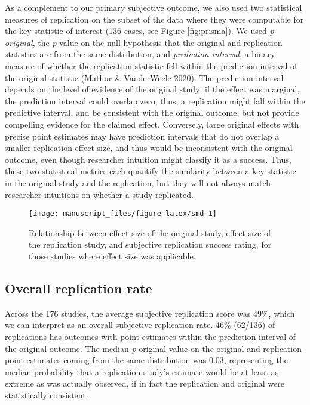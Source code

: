 \documentclass[
  english,
  a4paper,
]{article}
\begin{document}
As a complement to our primary subjective outcome, we also used two statistical measures of replication on the subset of the data where they were computable for the key statistic of interest (136 cases, see Figure \ref{fig:prisma}). We used \emph{p-original}, the \emph{p}-value on the null hypothesis that the original and replication statistics are from the same distribution, and \emph{prediction interval}, a binary measure of whether the replication statistic fell within the prediction interval of the original statistic (\protect\hyperlink{ref-mathur2020}{Mathur \& VanderWeele 2020}). The prediction interval depends on the level of evidence of the original study; if the effect was marginal, the prediction interval could overlap zero; thus, a replication might fall within the predictive interval, and be consistent with the original outcome, but not provide compelling evidence for the claimed effect. Conversely, large original effects with precise point estimates may have prediction intervals that do not overlap a smaller replication effect size, and thus would be inconsistent with the original outcome, even though researcher intuition might classify it as a success. Thus, these two statistical metrics each quantify the similarity between a key statistic in the original study and the replication, but they will not always match researcher intuitions on whether a study replicated.

\begin{figure}[ht]
\texttt{[image: manuscript\_files/figure-latex/smd-1]} \caption{Relationship between effect size of the original study, effect size of the replication study, and subjective replication success rating, for those studies where effect size was applicable.}\label{fig:smd}
\end{figure}

\hypertarget{overall-replication-rate}{%
\subsection{Overall replication rate}\label{overall-replication-rate}}

Across the 176 studies, the average subjective replication score was 49\%, which we can interpret as an overall subjective replication rate. 46\% (62/136) of replications has outcomes with point-estimates within the prediction interval of the original outcome. The median \emph{p}-original value on the original and replication point-estimates coming from the same distribution was 0.03, representing the median probability that a replication study's estimate would be at least as extreme as was actually observed, if in fact the replication and original were statistically consistent.
\end{document}
